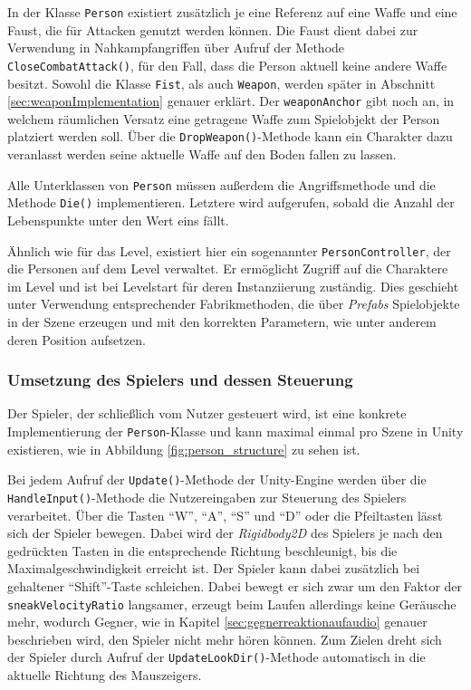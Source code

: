 In der Klasse \texttt{Person} existiert zusätzlich je eine Referenz auf eine Waffe und eine Faust, die für Attacken genutzt werden können. Die Faust dient dabei zur Verwendung in Nahkampfangriffen über Aufruf der Methode \texttt{CloseCombatAttack()}, für den Fall, dass die Person aktuell keine andere Waffe besitzt. Sowohl die Klasse \texttt{Fist}, als auch \texttt{Weapon}, werden später in Abschnitt \ref{sec:weaponImplementation} genauer erklärt. Der \texttt{weaponAnchor} gibt noch an, in welchem räumlichen Versatz eine getragene Waffe zum Spielobjekt der Person platziert werden soll. Über die \texttt{DropWeapon()}-Methode kann ein Charakter dazu veranlasst werden seine aktuelle Waffe auf den Boden fallen zu lassen.

Alle Unterklassen von \texttt{Person} müssen außerdem die Angriffsmethode und die Methode \texttt{Die()} implementieren. Letztere wird aufgerufen, sobald die Anzahl der Lebenspunkte unter den Wert eins fällt.

Ähnlich wie für das Level, existiert hier ein sogenannter \texttt{PersonController}, der die Personen auf dem Level verwaltet. Er ermöglicht Zugriff auf die Charaktere im Level und ist bei Levelstart für deren Instanziierung zuständig. Dies geschieht unter Verwendung entsprechender Fabrikmethoden, die über \textit{Prefabs} Spielobjekte in der Szene erzeugen und mit den korrekten Parametern, wie unter anderem deren Position aufsetzen.

\subsubsection{Umsetzung des Spielers und dessen Steuerung}\label{sec:player}
Der Spieler, der schließlich vom Nutzer gesteuert wird, ist eine konkrete Implementierung der \texttt{Person}-Klasse und kann maximal einmal pro Szene in Unity existieren, wie in Abbildung \ref{fig:person_structure} zu sehen ist.

Bei jedem Aufruf der \texttt{Update()}-Methode der Unity-Engine werden über die \texttt{HandleInput()}-Methode die Nutzereingaben zur Steuerung des Spielers verarbeitet. Über die Tasten "`W"', "`A"', "`S"' und "`D"' oder die Pfeiltasten lässt sich der Spieler bewegen. Dabei wird der \textit{Rigidbody2D} des Spielers je nach den gedrückten Tasten in die entsprechende Richtung beschleunigt, bis die Maximalgeschwindigkeit erreicht ist. Der Spieler kann dabei zusätzlich bei gehaltener "`Shift"'-Taste schleichen. Dabei bewegt er sich zwar um den Faktor der \texttt{sneakVelocityRatio} langsamer, erzeugt beim Laufen allerdings keine Geräusche mehr, wodurch Gegner, wie in Kapitel \ref{sec:gegnerreaktionaufaudio} genauer beschrieben wird, den Spieler nicht mehr hören können. Zum Zielen dreht sich der Spieler durch Aufruf der \texttt{UpdateLookDir()}-Methode automatisch in die aktuelle Richtung des Mauszeigers.

